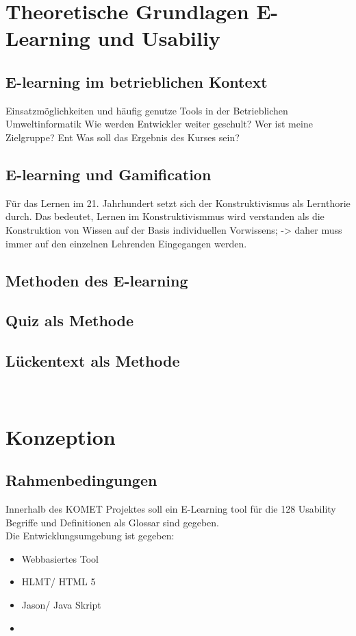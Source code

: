 \documentclass[a4paper, 12pt, twoside, BCOR=20mm, DIV=calc, abstracton, parskip=half*, toc=bibliography, toc=listof, headsepline, headings=small, numbers=enddot]{scrreprt} %
\begin{document}
\chapter{Theoretische Grundlagen E-Learning und Usabiliy}
\section{E-learning im betrieblichen Kontext}
Einsatzmöglichkeiten und häufig genutze Tools in der Betrieblichen Umweltinformatik 
Wie werden Entwickler weiter geschult?
Wer ist meine Zielgruppe?  Ent
Was soll das Ergebnis des Kurses sein?

\section{E-learning und Gamification}
Für das Lernen im 21. Jahrhundert setzt sich der Konstruktivismus als Lernthorie durch. Das bedeutet, Lernen im Konstruktivismmus wird verstanden als die Konstruktion von Wissen auf der Basis individuellen Vorwissens; -> daher muss immer auf den einzelnen Lehrenden Eingegangen werden. \cite[S.8]{1}
\section{Methoden des E-learning}
\section{Quiz als Methode}
\section{Lückentext als Methode}
\

\chapter{Konzeption}
\section{Rahmenbedingungen}
Innerhalb des KOMET Projektes soll ein E-Learning tool für die 128 Usability Begriffe und Definitionen als Glossar sind gegeben. \\Die Entwicklungsumgebung ist gegeben:
\begin{itemize}
\item{Webbasiertes Tool}
\item{HLMT/ HTML 5}
\item{Jason/ Java Skript}
\item{} 
\end{itemize}
\end{document}
